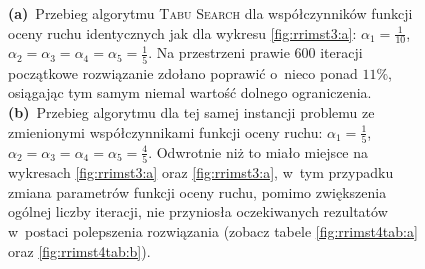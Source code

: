 \begin{figure}[!h]
{		 \textbf{(a)}~Przebieg algorytmu \textsc{Tabu Search} dla współczynników funkcji oceny ruchu identycznych jak dla wykresu \ref{fig:rrimst3:a}: $\alpha_{1} = \frac{1}{10}$, $\alpha_{2} = \alpha_{3} = \alpha_{4} = \alpha_{5} = \frac{1}{5}$.
		 Na przestrzeni prawie $600$ iteracji początkowe rozwiązanie zdołano poprawić o~nieco ponad $11\%$, osiągając tym samym niemal wartość dolnego ograniczenia.
		 \textbf{(b)}~Przebieg algorytmu dla tej samej instancji problemu ze zmienionymi współczynnikami funkcji oceny ruchu: $\alpha_{1} = \frac{1}{5}$, $\alpha_{2} = \alpha_{3} = \alpha_{4} = \alpha_{5} = \frac{4}{5}$.
		 Odwrotnie niż to miało miejsce na wykresach \ref{fig:rrimst3:a} oraz \ref{fig:rrimst3:a}, w~tym przypadku zmiana parametrów funkcji oceny ruchu, pomimo zwiększenia ogólnej liczby iteracji, nie przyniosła oczekiwanych rezultatów w~postaci polepszenia rozwiązania (zobacz tabele \ref{fig:rrimst4tab:a} oraz \ref{fig:rrimst4tab:b}).
	}
	\label{fig:rrimst4}
\end{figure}


